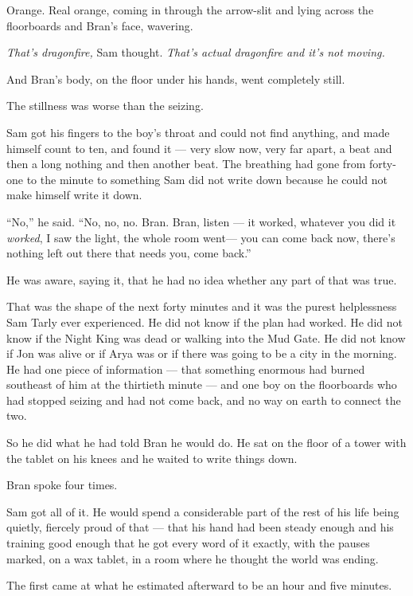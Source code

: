 Orange. Real orange, coming in through the arrow-slit and lying across the floorboards and Bran’s face, wavering.

\textit{That’s dragonfire,} Sam thought. \textit{That’s actual dragonfire and it’s not moving.}

And Bran’s body, on the floor under his hands, went completely still.

\sceneBreak

The stillness was worse than the seizing.

Sam got his fingers to the boy’s throat and could not find anything, and made himself count to ten, and found it — very slow now, very far apart, a beat and then a long nothing and then another beat. The breathing had gone from forty-one to the minute to something Sam did not write down because he could not make himself write it down.

“No,” he said. “No, no, no. Bran. Bran, listen — it worked, whatever you did it \textit{worked}, I saw the light, the whole room went— you can come back now, there’s nothing left out there that needs you, come back.”

He was aware, saying it, that he had no idea whether any part of that was true.

That was the shape of the next forty minutes and it was the purest helplessness Sam Tarly ever experienced. He did not know if the plan had worked. He did not know if the Night King was dead or walking into the Mud Gate. He did not know if Jon was alive or if Arya was or if there was going to be a city in the morning. He had one piece of information — that something enormous had burned southeast of him at the thirtieth minute — and one boy on the floorboards who had stopped seizing and had not come back, and no way on earth to connect the two.

So he did what he had told Bran he would do. He sat on the floor of a tower with the tablet on his knees and he waited to write things down.

\sceneBreak

Bran spoke four times.

Sam got all of it. He would spend a considerable part of the rest of his life being quietly, fiercely proud of that — that his hand had been steady enough and his training good enough that he got every word of it exactly, with the pauses marked, on a wax tablet, in a room where he thought the world was ending.

The first came at what he estimated afterward to be an hour and five minutes.


